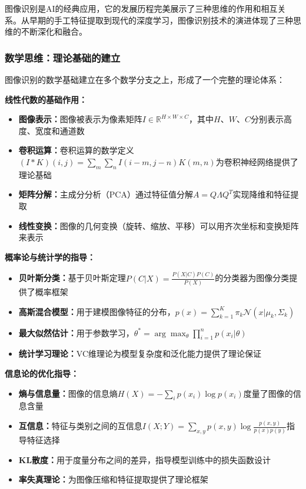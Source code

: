 图像识别是AI的经典应用，它的发展历程完美展示了三种思维的作用和相互关系。从早期的手工特征提取到现代的深度学习，图像识别技术的演进体现了三种思维的不断深化和融合。

\subsubsection{数学思维：理论基础的建立}

图像识别的数学基础建立在多个数学分支之上，形成了一个完整的理论体系：

\textbf{线性代数的基础作用：}
\begin{itemize}
\item \textbf{图像表示：}图像被表示为像素矩阵$I \in \mathbb{R}^{H \times W \times C}$，其中$H$、$W$、$C$分别表示高度、宽度和通道数
\item \textbf{卷积运算：}卷积运算的数学定义$(I * K)(i,j) = \sum_{m}\sum_{n} I(i-m, j-n)K(m,n)$为卷积神经网络提供了理论基础
\item \textbf{矩阵分解：}主成分分析（PCA）通过特征值分解$A = Q\Lambda Q^T$实现降维和特征提取
\item \textbf{线性变换：}图像的几何变换（旋转、缩放、平移）可以用齐次坐标和变换矩阵来表示
\end{itemize}

\textbf{概率论与统计学的指导：}
\begin{itemize}
\item \textbf{贝叶斯分类：}基于贝叶斯定理$P(C|X) = \frac{P(X|C)P(C)}{P(X)}$的分类器为图像分类提供了概率框架
\item \textbf{高斯混合模型：}用于建模图像特征的分布，$p(x) = \sum_{k=1}^K \pi_k \mathcal{N}(x|\mu_k, \Sigma_k)$
\item \textbf{最大似然估计：}用于参数学习，$\theta^* = \arg\max_\theta \prod_{i=1}^n p(x_i|\theta)$
\item \textbf{统计学习理论：}VC维理论为模型复杂度和泛化能力提供了理论保证
\end{itemize}

\textbf{信息论的优化指导：}
\begin{itemize}
\item \textbf{熵与信息量：}图像的信息熵$H(X) = -\sum_{i} p(x_i) \log p(x_i)$度量了图像的信息含量
\item \textbf{互信息：}特征与类别之间的互信息$I(X;Y) = \sum_{x,y} p(x,y) \log \frac{p(x,y)}{p(x)p(y)}$指导特征选择
\item \textbf{KL散度：}用于度量分布之间的差异，指导模型训练中的损失函数设计
\item \textbf{率失真理论：}为图像压缩和特征提取提供了理论框架
\end{itemize}

